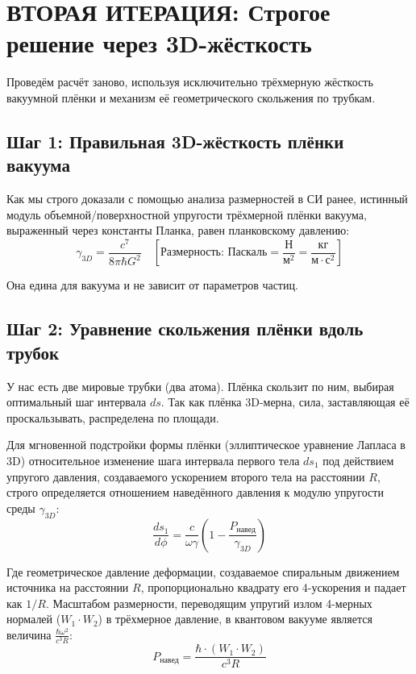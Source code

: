 \documentclass[12pt,a4paper]{article}
\begin{document}
\section*{ВТОРАЯ ИТЕРАЦИЯ: Строгое решение через 3D-жёсткость}

Проведём расчёт заново, используя исключительно трёхмерную жёсткость вакуумной плёнки и механизм её геометрического скольжения по трубкам.

\subsection*{Шаг 1: Правильная 3D-жёсткость плёнки вакуума}

Как мы строго доказали с помощью анализа размерностей в СИ ранее, истинный модуль объемной/поверхностной упругости трёхмерной плёнки вакуума, выраженный через константы Планка, равен планковскому давлению:
\begin{equation}
\gamma_{3D} = \frac{c^7}{8\pi \hbar G^2} \quad \left[ \text{Размерность: Паскаль} = \frac{\text{Н}}{\text{м}^2} = \frac{\text{кг}}{\text{м} \cdot \text{с}^2} \right]
\end{equation}

Она едина для вакуума и не зависит от параметров частиц.

\subsection*{Шаг 2: Уравнение скольжения плёнки вдоль трубок}

У нас есть две мировые трубки (два атома). Плёнка скользит по ним, выбирая оптимальный шаг интервала $ds$. Так как плёнка 3D-мерна, сила, заставляющая её проскальзывать, распределена по площади.

Для мгновенной подстройки формы плёнки (эллиптическое уравнение Лапласа в 3D) относительное изменение шага интервала первого тела $ds_1$ под действием упругого давления, создаваемого ускорением второго тела на расстоянии $R$, строго определяется отношением наведённого давления к модулю упругости среды $\gamma_{3D}$:
\begin{equation}
\frac{ds_1}{d\phi} = \frac{c}{\omega \gamma} \left( 1 - \frac{P_{навед}}{\gamma_{3D}} \right)
\end{equation}

Где геометрическое давление деформации, создаваемое спиральным движением источника на расстоянии $R$, пропорционально квадрату его 4-ускорения и падает как $1/R$. Масштабом размерности, переводящим упругий излом 4-мерных нормалей ($W_1 \cdot W_2$) в трёхмерное давление, в квантовом вакууме является величина $\frac{\hbar \omega^2}{c^3 R}$:
\begin{equation}
P_{навед} = \frac{\hbar \cdot (W_1 \cdot W_2)}{c^3 R}
\end{equation}
\end{document}
